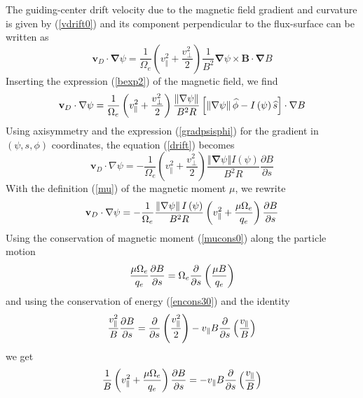 The guiding-center drift velocity due to the magnetic field gradient and
curvature is given by (\ref{vdrift0}) and its component perpendicular to the
flux-surface can be written as 
\begin{equation}
\mathbf{v}_{D}\cdot\mathbf{\nabla}\psi=\frac{1}{\Omega_{e}}\left( v_{\Vert
}^{2}+\frac{v_{\bot}^{2}}{2}\right) \frac{1}{B^{2}}\mathbf{\nabla}\psi \times%
\mathbf{B}\cdot\mathbf{\nabla}B
\end{equation}
Inserting the expression (\ref{bexp2}) of the magnetic field, we find 
\begin{equation}
\mathbf{v}_{D}\cdot\nabla\psi=\frac{1}{\Omega_{e}}\left( v_{\Vert}^{2}+\frac{%
v_{\bot}^{2}}{2}\right) \frac{\left\Vert \mathbf{\nabla}\psi\right\Vert }{%
B^{2}R}\left[ \left\Vert \mathbf{\nabla}\psi\right\Vert \widehat{\phi}%
-I\left( \psi\right) \widehat{s}\right] \cdot\mathbf{\nabla}B   \label{drift}
\end{equation}
Using axisymmetry and the expression (\ref{gradpsisphi}) for the gradient in 
$\left( \psi,s,\phi\right) $ coordinates, the equation (\ref{drift}) becomes 
\begin{equation}
\mathbf{v}_{D}\cdot\nabla\psi=-\frac{1}{\Omega_{e}}\left( v_{\Vert}^{2}+%
\frac{v_{\bot}^{2}}{2}\right) \frac{\left\Vert \mathbf{\nabla}%
\psi\right\Vert I\left( \psi\right) }{B^{2}R}\frac{\partial B}{\partial s}
\end{equation}
With the definition (\ref{mu}) of the magnetic moment $\mu$, we rewrite 
\begin{equation}
\mathbf{v}_{D}\cdot\nabla\psi=-\frac{1}{\Omega_{e}}\frac{\left\Vert \mathbf{%
\nabla}\psi\right\Vert I\left( \psi\right) }{B^{2}R}\left( v_{\Vert}^{2}+%
\dfrac{\mu\Omega_{e}}{q_{e}}\right) \frac{\partial B}{\partial s} 
\label{drift2}
\end{equation}
Using the conservation of magnetic moment (\ref{mucons0}) along the particle
motion 
\begin{equation}
\dfrac{\mu\Omega_{e}}{q_{e}}\frac{\partial B}{\partial s}=\Omega_{e}\frac{%
\partial}{\partial s}\left( \frac{\mu B}{q_{e}}\right)
\end{equation}
and using the conservation of energy (\ref{encons30}) and the identity%
\begin{equation}
\dfrac{v_{\Vert}^{2}}{B}\frac{\partial B}{\partial s}=\frac{\partial}{%
\partial s}\left( \dfrac{v_{\Vert}^{2}}{2}\right) -v_{\Vert}B\frac{\partial}{%
\partial s}\left( \dfrac{v_{\Vert}}{B}\right)
\end{equation}
we get%
\begin{equation}
\dfrac{1}{B}\left( v_{\Vert}^{2}+\dfrac{\mu\Omega_{e}}{q_{e}}\right) \frac{%
\partial B}{\partial s}=-v_{\Vert}B\frac{\partial}{\partial s}\left( \dfrac{%
v_{\Vert}}{B}\right)
\end{equation}
